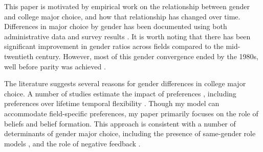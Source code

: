\documentclass[11 pt]{article}
\begin{document}
This paper is motivated by empirical work on the relationship between gender and college major choice, and how that relationship has changed over time.
Differences in major choice by gender has been documented using both administrative data \parencite{D10} and survey results \parencite{Z13}.
It is worth noting that there has been significant improvement in gender ratios across fields compared to the mid-twentieth century.
However, most of this gender convergence ended by the 1980s, well before parity was achieved \parencite{SHB19,EL06}. 


The literature suggests several reasons for gender differences in college major choice.
A number of studies estimate the impact of preferences \parencite{Z13,WZ14}, including preferences over lifetime temporal flexibility \parencite{B15,WZ18}.
Though my model can accommodate field-specific preferences, my paper primarily focuses on the role of beliefs and belief formation.
This approach is consistent with a number of determinants of gender major choice, including the presence of same-gender role models \parencite{PS20,LM20}, and the role of negative feedback \parencite{KTU17}.



\end{document}
